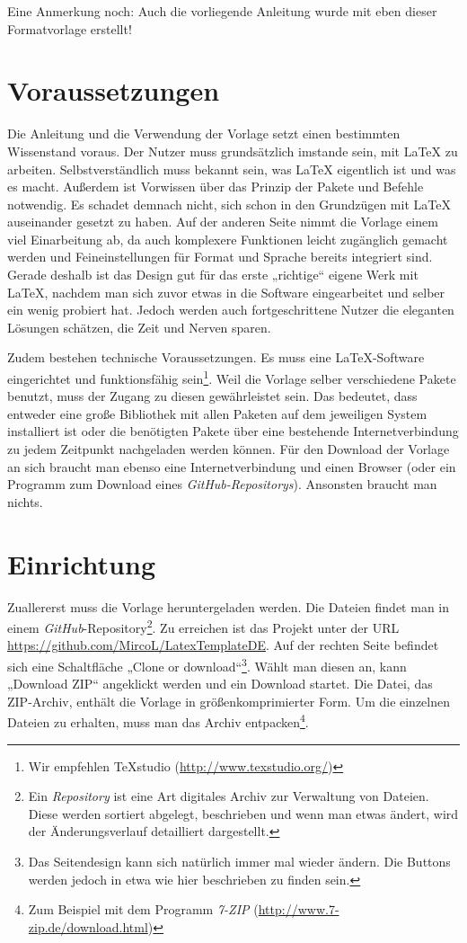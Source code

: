 			Eine Anmerkung noch: Auch die vorliegende Anleitung wurde mit eben dieser Formatvorlage erstellt! 
	
		\section{Voraussetzungen}
		
			Die Anleitung und die Verwendung der Vorlage setzt einen bestimmten Wissenstand voraus. Der Nutzer muss grundsätzlich imstande sein, mit \LaTeX{} zu arbeiten. Selbstverständlich muss bekannt sein, was \LaTeX{} eigentlich ist und was es macht. Außerdem ist Vorwissen über das Prinzip der Pakete und Befehle notwendig. Es schadet demnach nicht, sich schon in den Grundzügen mit \LaTeX{} auseinander gesetzt zu haben. Auf der anderen Seite nimmt die Vorlage einem viel Einarbeitung ab, da auch komplexere Funktionen leicht zugänglich gemacht werden und Feineinstellungen für Format und Sprache bereits integriert sind. Gerade deshalb ist das Design gut für das erste „richtige“ eigene Werk mit \LaTeX{}, nachdem man sich zuvor etwas in die Software eingearbeitet und selber ein wenig probiert hat. Jedoch werden auch fortgeschrittene Nutzer die eleganten Lösungen schätzen, die Zeit und Nerven sparen. 
			
			Zudem bestehen technische Voraussetzungen. Es muss eine \LaTeX{}-Software eingerichtet und funktionsfähig sein\footnote{Wir empfehlen TeXstudio (\url{http://www.texstudio.org/})}. Weil die Vorlage selber verschiedene Pakete benutzt, muss der Zugang zu diesen gewährleistet sein. Das bedeutet, dass entweder eine große Bibliothek mit allen Paketen auf dem jeweiligen System installiert ist oder die benötigten Pakete über eine bestehende Internetverbindung zu jedem Zeitpunkt nachgeladen werden können. Für den Download der Vorlage an sich braucht man ebenso eine Internetverbindung und einen Browser (oder ein Programm zum Download eines \emph{GitHub-Repositorys}). Ansonsten braucht man nichts. 
		
		\section{Einrichtung}
		
			Zuallererst muss die Vorlage heruntergeladen werden. Die Dateien findet man in einem \emph{GitHub}-Repository\footnote{Ein \emph{Repository} ist eine Art digitales Archiv zur Verwaltung von Dateien. Diese werden sortiert abgelegt, beschrieben und wenn man etwas ändert, wird der Änderungsverlauf detailliert dargestellt.}. Zu erreichen ist das Projekt unter der URL \url{https://github.com/MircoL/LatexTemplateDE}. Auf der rechten Seite befindet sich eine Schaltfläche „Clone or download“\footnote{Das Seitendesign kann sich natürlich immer mal wieder ändern. Die Buttons werden jedoch in etwa wie hier beschrieben zu finden sein.}. Wählt man diesen an, kann „Download ZIP“ angeklickt werden und ein Download startet. Die Datei, das ZIP-Archiv, enthält die Vorlage in größenkomprimierter Form. Um die einzelnen Dateien zu erhalten, muss man das Archiv entpacken\footnote{Zum Beispiel mit dem Programm \emph{7-ZIP} (\url{http://www.7-zip.de/download.html})}. 
			
